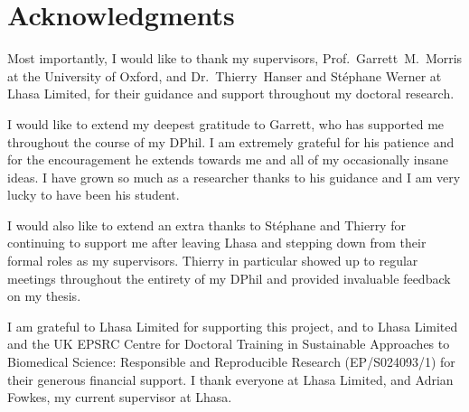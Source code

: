 \documentclass[a4paper,12pt]{report}
\begin{document}

\chapter*{Acknowledgments}

Most importantly, I would like to thank my supervisors, Prof.~Garrett~M.~Morris at the University of Oxford, and Dr.~Thierry~Hanser and St\'{e}phane Werner at Lhasa Limited, for their guidance and support throughout my doctoral research.

I would like to extend my deepest gratitude to Garrett, who has supported me throughout the course of my DPhil. I am extremely grateful for his patience and for the encouragement he extends towards me and all of my occasionally insane ideas. I have grown so much as a researcher thanks to his guidance and I am very lucky to have been his student. 

I would also like to extend an extra thanks to St\'{e}phane and Thierry for continuing to support me after leaving Lhasa and stepping down from their formal roles as my supervisors. Thierry in particular showed up to regular meetings throughout the entirety of my DPhil and provided invaluable feedback on my thesis. 

I am grateful to Lhasa Limited for supporting this project, and to Lhasa Limited and the UK EPSRC Centre for Doctoral Training in Sustainable Approaches to Biomedical Science: Responsible and Reproducible Research (EP/S024093/1) for their generous financial support.
I thank everyone at Lhasa Limited, and Adrian Fowkes, my current supervisor at Lhasa.
\end{document}
